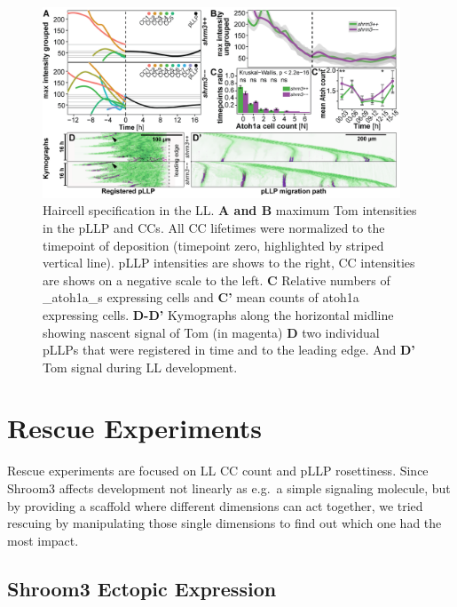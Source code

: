 \documentclass[11pt,singlespacinge,twoside]{reedthesis} %
\begin{document}
\begin{figure}

{\centering \includegraphics[width=0.95\textwidth]{figures/results/05_atoh/Figure_7-white-01} 

}

\caption[Haircell specification in the LL]{Haircell specification in the LL. \textbf{A and B} maximum Tom intensities in the pLLP and CCs. All CC lifetimes were normalized to the timepoint of deposition (timepoint zero, highlighted by striped vertical line). pLLP intensities are shows to the right, CC intensities are shows on a negative scale to the left. \textbf{C} Relative numbers of \_atoh1a\_s expressing cells and \textbf{C'} mean counts of atoh1a expressing cells. \textbf{D-D'} Kymographs along the horizontal midline showing nascent signal of Tom (in magenta) \textbf{D} two individual pLLPs that were registered in time and to the leading edge. And \textbf{D'} Tom signal during LL development.}\label{fig:hctl}
\end{figure}
\hypertarget{rescue-experiments}{%
\section{Rescue Experiments}\label{rescue-experiments}}

Rescue experiments are focused on LL CC count and pLLP rosettiness. Since Shroom3 affects development not linearly as e.g.~a simple signaling molecule, but by providing a scaffold where different dimensions can act together, we tried rescuing by manipulating those single dimensions to find out which one had the most impact.

\hypertarget{shroom3-ectopic-expression}{%
\subsection{Shroom3 Ectopic Expression}\label{shroom3-ectopic-expression}}
\end{document}
